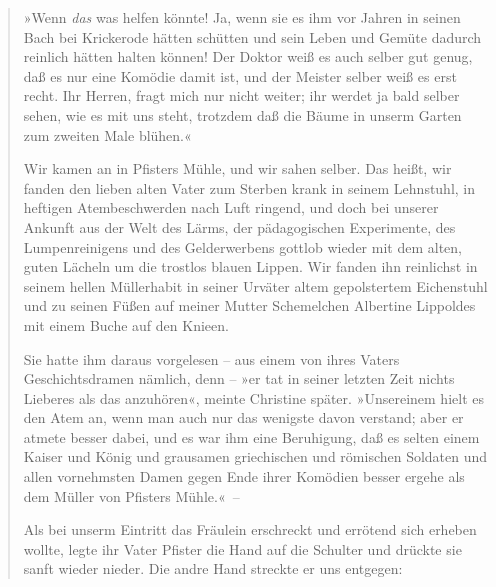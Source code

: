 \begin{verse}
»Wenn \emph{das} was helfen könnte! Ja, wenn sie es ihm vor Jahren
in seinen Bach bei Krickerode hätten schütten und sein Leben und
Gemüte dadurch reinlich hätten halten können! Der Doktor weiß es
auch selber gut genug, daß es nur eine Komödie damit ist, und der
Meister selber weiß es erst recht. Ihr Herren, fragt mich nur nicht
weiter; ihr werdet ja bald selber sehen, wie es mit uns steht,
trotzdem daß die Bäume in unserm Garten zum zweiten Male blühen.«

Wir kamen an in Pfisters Mühle, und wir sahen selber. Das heißt,
wir fanden den lieben alten Vater zum Sterben krank in seinem
Lehnstuhl, in heftigen Atembeschwerden nach Luft ringend, und doch
bei unserer Ankunft aus der Welt des Lärms, der pädagogischen
Experimente, des Lumpenreinigens und des Gelderwerbens gottlob
wieder mit dem alten, guten Lächeln um die trostlos blauen Lippen.
Wir fanden ihn reinlichst in seinem hellen Müllerhabit in seiner
Urväter altem gepolstertem Eichenstuhl und zu seinen Füßen auf
meiner Mutter Schemelchen Albertine Lippoldes mit einem Buche auf
den Knieen.

Sie hatte ihm daraus vorgelesen – aus einem von ihres Vaters
Geschichtsdramen nämlich, denn – »er tat in seiner letzten Zeit
nichts Lieberes als das anzuhören«, meinte Christine später.
»Unsereinem hielt es den Atem an, wenn man auch nur das wenigste
davon verstand; aber er atmete besser dabei, und es war ihm eine
Beruhigung, daß es selten einem Kaiser und König und grausamen
griechischen und römischen Soldaten und allen vornehmsten Damen
gegen Ende ihrer Komödien besser ergehe als dem Müller von Pfisters
Mühle.«~–

Als bei unserm Eintritt das Fräulein erschreckt und errötend sich
erheben wollte, legte ihr Vater Pfister die Hand auf die Schulter
und drückte sie sanft wieder nieder. Die andre Hand streckte er uns
entgegen:


\end{verse}
